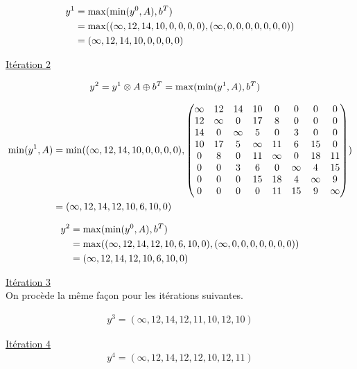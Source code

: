 \documentclass{article}
\begin{document}
\begin{align*}
  y^1 &= \operatorname{max}(\operatorname{min}(y^0,A),b^T)\\
  &= \operatorname{max}((\infty, 12,14,10,0,0,0,0), (\infty,0,0,0,0,0,0,0))\\
  &= (\infty, 12,14,10,0,0,0,0)
\end{align*}

\underline{Itération 2}

\begin{align*}
  y^2 &= y^1 \otimes A \oplus b^T = \operatorname{max}(\operatorname{min}(y^1,A),b^T)
\end{align*}

\begin{align*}
  \operatorname{min}(y^1,A) &= \operatorname{min}((\infty,12,14,10,0,0,0,0),
  \begin{pmatrix}
      \infty & 12 & 14 & 10 & 0 & 0 & 0 & 0 \\
      12 & \infty & 0 & 17 & 8 & 0 & 0 & 0 \\
      14 & 0 & \infty & 5 & 0 & 3 & 0 & 0 \\
      10 & 17 & 5 & \infty & 11 & 6 & 15 & 0 \\
      0 & 8 & 0 & 11 & \infty & 0 & 18 & 11 \\
      0 & 0 & 3 & 6 & 0 & \infty & 4 & 15 \\
      0 & 0 & 0 & 15 & 18 & 4 & \infty & 9 \\
      0 & 0 & 0 & 0 & 11 & 15 & 9 & \infty
  \end{pmatrix})\\
  &= (\infty, 12,14,12,10,6,10,0)
\end{align*}

\begin{align*}
  y^2 &= \operatorname{max}(\operatorname{min}(y^0,A),b^T)\\
  &= \operatorname{max}((\infty, 12,14,12,10,6,10,0), (\infty,0,0,0,0,0,0,0))\\
  &= (\infty, 12,14,12,10,6,10,0)
\end{align*}

\underline{Itération 3}\\

On procède la même façon pour les itérations suivantes.

\begin{align*}
  y^3 = (\infty,12,14,12,11,10,12,10)
\end{align*}

\underline{Itération 4}\\

\begin{align*}
  y^4 = (\infty,12,14,12,12,10,12,11)
\end{align*}
\end{document}
